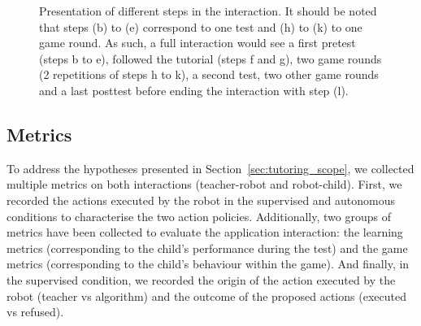 \begin{figure}[ht]
	\caption{Presentation of different steps in the interaction. It should be noted that steps (b) to (e) correspond to one test and (h) to (k) to one game round. As such, a full interaction would see a first pretest (steps b to e), followed the tutorial (steps f and g), two game rounds (2 repetitions of steps h to k), a second test, two other game rounds and a last posttest before ending the interaction with step (l).}
	\label{fig:tuto_sequence}
\end{figure}


\subsection{Metrics}


To address the hypotheses presented in Section~\ref{sec:tutoring_scope}, we collected multiple metrics on both interactions (teacher-robot and robot-child). First, we recorded the actions executed by the robot in the supervised and autonomous conditions to characterise the two action policies. Additionally, two groups of metrics have been collected to evaluate the application interaction: the learning metrics (corresponding to the child's performance during the test) and the game metrics (corresponding to the child's behaviour within the game). And finally, in the supervised condition, we recorded the origin of the action executed by the robot (teacher vs algorithm) and the outcome of the proposed actions (executed vs refused).

